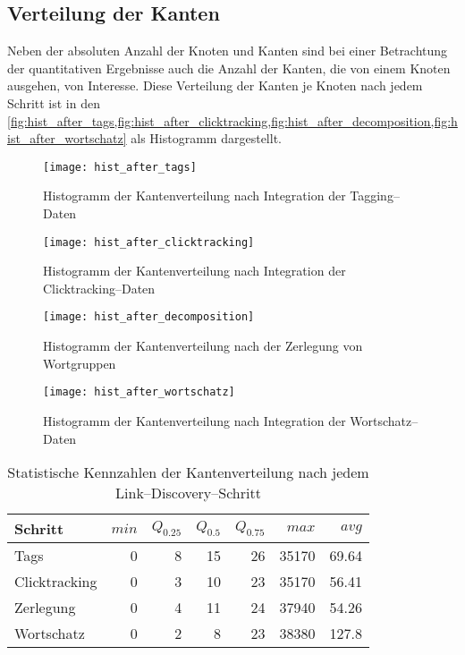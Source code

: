 \subsection{Verteilung der Kanten}

Neben der absoluten Anzahl der Knoten und Kanten sind bei einer Betrachtung der quantitativen Ergebnisse auch die Anzahl der Kanten, die von einem Knoten ausgehen, von Interesse. Diese Verteilung der Kanten je Knoten nach jedem Schritt ist in den \cref{fig:hist_after_tags,fig:hist_after_clicktracking,fig:hist_after_decomposition,fig:hist_after_wortschatz} als Histogramm dargestellt.

\begin{figure}[p]
\centering
\texttt{[image: hist\_after\_tags]}
\caption{Histogramm der Kantenverteilung nach Integration der Tagging--Daten}
\label{fig:hist_after_tags}
\end{figure}

\begin{figure}[p]
\centering
\texttt{[image: hist\_after\_clicktracking]}
\caption{Histogramm der Kantenverteilung nach Integration der Clicktracking--Daten}
\label{fig:hist_after_clicktracking}
\end{figure}

\begin{figure}[p]
\centering
\texttt{[image: hist\_after\_decomposition]}
\caption{Histogramm der Kantenverteilung nach der Zerlegung von Wortgruppen}
\label{fig:hist_after_decomposition}
\end{figure}

\begin{figure}[p]
\centering
\texttt{[image: hist\_after\_wortschatz]}
\caption{Histogramm der Kantenverteilung nach Integration der Wortschatz--Daten}
\label{fig:hist_after_wortschatz}
\end{figure}

\begin{table}[h]
\centering
\begin{tabular}{lrrrrrr}
    \toprule
    Schritt & \(min\) & \(Q_{0.25}\) & \(Q_{0.5}\) & \(Q_{0.75}\) & \(max\) & \(avg\) \\
    \midrule
    Tags & \num{0} & \num{8} & \num{15} & \num{26} & \num{35170} & \num{69,64} \\
    Clicktracking & \num{0} & \num{3} & \num{10} & \num{23} & \num{35170} & \num{56,41} \\
    Zerlegung & \num{0} & \num{4} & \num{11} & \num{24} & \num{37940} & \num{54,26} \\
    Wortschatz & \num{0} & \num{2} & \num{8} & \num{23} & \num{38380} & \num{127,8} \\
    \bottomrule
\end{tabular}
\caption{Statistische Kennzahlen der Kantenverteilung nach jedem Link--Discovery--Schritt}
\label{tab:discovery_edges_per_node}
\end{table}

